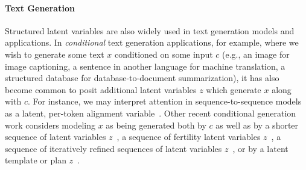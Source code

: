 \documentclass{article}
\begin{document}
\paragraph{Text Generation}
Structured latent variables are also widely used in text generation models and applications. %
In \textit{conditional} text generation applications, for example, where we wish to generate some text $x$ conditioned on some input $c$ (e.g., an image for image captioning, a sentence in another language for machine translation, a structured database for database-to-document summarization), it has also become common to  posit additional latent variables $z$ which generate $x$ along with $c$. For instance, we may interpret attention in sequence-to-sequence models as a latent, per-token alignment variable~\citep{Xu2015,deng2018}. Other recent conditional generation work considers modeling $x$ as being generated both by $c$ as well as by a shorter sequence of latent variables $z$~\citep{kaiser2018fast,roy2018theory}, a sequence of fertility latent variables $z$~\citep{gu2018nonautoregressive}, a sequence of iteratively refined sequences of latent variables $z$~\citep{lee2018deterministic}, or by a latent template or plan $z$~\citep{wiseman2018learning}. 
\end{document}
